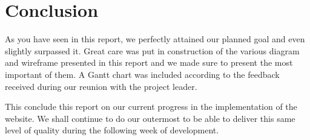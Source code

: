 \section{Conclusion}

As you have seen in this report, we perfectly attained our planned goal and
even slightly surpassed it. Great care was put in construction of the
various diagram and wireframe presented in this report and we made sure to
present the most important of them. A Gantt chart was included according
to the feedback received during our reunion with the project leader. \newline

This conclude this report on our current progress in the implementation of
the website. We shall continue to do our outermost to be able to deliver
this same level of quality during the following week of development.
